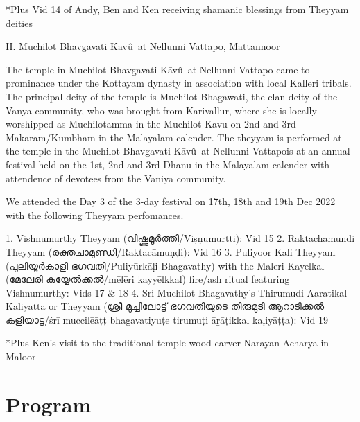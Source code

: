 \documentclass[a4paper, 11pt]{article} %
\newcommand{\Kavu}[0]{K\={a}v\^{u}}
\begin{document}
*Plus Vid 14 of Andy, Ben and Ken receiving shamanic blessings from Theyyam deities 

II. Muchilot Bhavgavati \Kavu\ at Nellunni Vattapo, Mattannoor

The temple in Muchilot Bhavgavati \Kavu\ at Nellunni Vattapo came to prominance under the Kottayam dynasty in association with local Kalleri tribals. The principal deity of the temple is Muchilot Bhagawati, the clan deity of the Vanya community, who was brought from Karivallur, where she is locally worshipped as Muchilotamma in the Muchilot Kavu on 2nd and 3rd Makaram/Kumbham in the Malayalam calender. The theyyam is performed at the temple in the Muchilot Bhavgavati \Kavu\ at Nellunni Vattapois at an annual festival held on the 1st, 2nd and 3rd Dhanu in the Malayalam calender with attendence of devotees from the Vaniya community.

We attended the Day 3 of the 3-day festival on 17th, 18th and 19th Dec 2022 with the following Theyyam perfomances.

1. Vishnumurthy Theyyam (വിഷ്ണുമൂർത്തി/Viṣṇumūrtti): Vid 15
2. Raktachamundi Theyyam (രക്തചാമുണ്ഡി/Raktacāmuṇḍi): Vid 16
3. Puliyoor Kali Theyyam (പുലിയൂർകാളി ഭഗവതി/Puliyūrkāḷi Bhagavathy) with the Maleri Kayelkal (മേലേരി കയ്യേൽക്കൽ/mēlēri kayyēlkkal) fire/ash ritual featuring Vishnumurthy: Vids 17 & 18
4. Sri Muchilot Bhagavathy's Thirumudi Aaratikal Kaliyatta or Theyyam (ശ്രീ മുച്ചിലോട്ട് ഭഗവതിയുടെ തിരുമുടി ആറാടിക്കൽ കളിയാട്ട/śrī muccilēāṭṭ bhagavatiyuṭe tirumuṭi āṟāṭikkal kaḷiyāṭṭa): Vid 19

*Plus Ken's visit to the traditional temple wood carver Narayan Acharya in Maloor

\section{Program}%
  \label{sec:Program}
  
\end{document}
